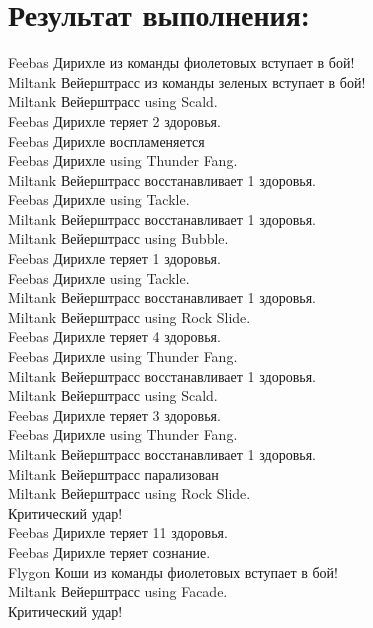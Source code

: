 \documentclass[12pt,onecolumn]{article}
\begin{document}
\section{Результат выполнения:}
\tiny{
Feebas Дирихле из команды фиолетовых вступает в бой!\\
Miltank Вейерштрасс из команды зеленых вступает в бой!\\
Miltank Вейерштрасс using Scald. \\
Feebas Дирихле теряет 2 здоровья.\\
Feebas Дирихле воспламеняется\\
\hfill \break
Feebas Дирихле using Thunder Fang. \\
Miltank Вейерштрасс восстанавливает 1 здоровья.\\
\hfill \break
Feebas Дирихле using Tackle. \\
Miltank Вейерштрасс восстанавливает 1 здоровья.\\
\hfill \break
Miltank Вейерштрасс using Bubble. \\
Feebas Дирихле теряет 1 здоровья.\\
\hfill \break
Feebas Дирихле using Tackle. \\
Miltank Вейерштрасс восстанавливает 1 здоровья.\\
\hfill \break
Miltank Вейерштрасс using Rock Slide. \\
Feebas Дирихле теряет 4 здоровья.\\
\hfill \break
Feebas Дирихле using Thunder Fang. \\
Miltank Вейерштрасс восстанавливает 1 здоровья.\\
\hfill \break
Miltank Вейерштрасс using Scald. \\
Feebas Дирихле теряет 3 здоровья.\\
\hfill \break
Feebas Дирихле using Thunder Fang. \\
Miltank Вейерштрасс восстанавливает 1 здоровья.\\
Miltank Вейерштрасс парализован\\
\hfill \break
Miltank Вейерштрасс using Rock Slide. \\
Критический удар!\\
Feebas Дирихле теряет 11 здоровья.\\
Feebas Дирихле теряет сознание.\\
Flygon Коши из команды фиолетовых вступает в бой!\\
Miltank Вейерштрасс using Facade. \\
Критический удар!\\
}
\end{document}
